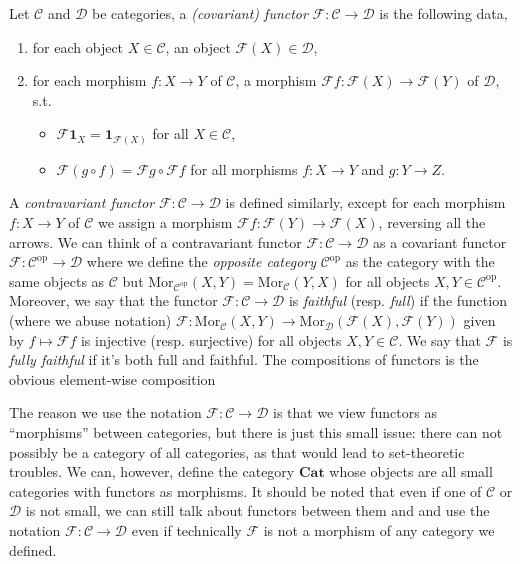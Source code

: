 \documentclass[11pt]{book}
\begin{document}
\begin{definition}Let $\mathcal C$ and $\mathcal D$ be categories, a \textit{(covariant) functor} $\mathscr{F}:\mathcal C\rightarrow\mathcal{D}$ is the following data,
\begin{enumerate}[label=(\roman*)]
	\item for each object $X\in\mathcal C$, an object $\mathscr{F}(X)\in\mathcal D$,
	\item for each morphism $f:X\rightarrow Y$ of $\mathcal C$, a morphism $\mathscr{F}f:\mathscr{F}(X)\rightarrow\mathscr{F}(Y)$ of $\mathcal D$, s.t.
	\begin{itemize}
		\item $\mathscr{F}\mathbf{1}_X=\mathbf 1_{\mathscr{F}(X)}$ for all $X\in\mathcal C$,
		\item $\mathscr{F}(g\circ f)=\mathscr{F}g\circ\mathscr{F}f$ for all morphisms $f:X\rightarrow Y$ and $g:Y\rightarrow Z$.
	\end{itemize}
\end{enumerate}
A \textit{contravariant functor} $\mathscr{F}:\mathcal C\rightarrow\mathcal D$ is defined similarly, except for each morphism $f:X\rightarrow Y$ of $\mathcal C$ we assign a morphism $\mathscr{F}f:\mathscr{F}(Y)\rightarrow\mathscr{F}(X)$, reversing all the arrows. We can think of a contravariant functor $\mathscr{F}:\mathcal{C}\rightarrow\mathcal D$ as a covariant functor $\mathscr{F}:\mathcal{C}^{\mathrm{op}}\rightarrow\mathcal D$ where we define the \textit{opposite category} $\mathcal C^{\mathrm{op}}$ as the category with the same objects as $\mathcal{C}$ but $\mathrm{Mor}_{\mathcal{C}^{\mathrm{op}}}(X,Y)=\mathrm{Mor}_{\mathcal{C}}(Y,X)$ for all objects $X,Y\in\mathcal C^{\mathrm{op}}$. Moreover, we say that the functor $\mathscr{F}:\mathcal C\rightarrow \mathcal D$ is \textit{faithful} (resp. \textit{full}) if the function (where we abuse notation)
$\mathscr{F}:\mathrm{Mor}_{\mathcal C}(X,Y)\rightarrow\mathrm{Mor}_{\mathcal D}(\mathscr F(X),\mathscr F(Y))$ given by $f\mapsto \mathscr{F}f$ is injective (resp. surjective) for all objects $X,Y\in\mathcal C$. We say that $\mathscr{F}$ is \textit{fully faithful} if it's both full and faithful. The compositions of functors is the obvious element-wise composition
\end{definition}
The reason we use the notation $\mathscr{F}:\mathcal C\rightarrow\mathcal D$ is that we view functors as ``morphisms'' between categories, but there is just this small issue: there can not possibly be a category of all categories, as that would lead to set-theoretic troubles. We can, however, define the category $\mathbf{Cat}$ whose objects are all small categories with functors as morphisms. It should be noted that even if one of $\mathcal C$ or $\mathcal D$ is not small, we can still talk about functors between them and and use the notation $\mathscr{F}:\mathcal C\rightarrow\mathcal D$ even if technically $\mathscr{F}$ is not a morphism of any category we defined. 
\end{document}

